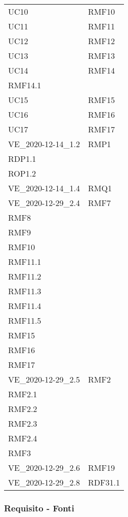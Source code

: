 \begin{longtable}[h!] { >{\centering}m{5cm} >{\centering}m{5cm} }
	 \tabularnewline
	 UC10 & RMF10
	 \tabularnewline
	 UC11 & RMF11
	 \tabularnewline
	 UC12 & RMF12
	 \tabularnewline
	 UC13 & RMF13
	 \tabularnewline
	 UC14 & RMF14 \\
	 RMF14.1
	 \tabularnewline
	 UC15 & RMF15
	 \tabularnewline
	 UC16 & RMF16
	 \tabularnewline
	 UC17 & RMF17
	 \tabularnewline
	 VE\_2020-12-14\_1.2 & RMP1 \\
	 RDP1.1 \\
	 ROP1.2
	 \tabularnewline
	 VE\_2020-12-14\_1.4 & RMQ1
	 \tabularnewline
	 VE\_2020-12-29\_2.4 & RMF7\\
	 RMF8 \\
	 RMF9 \\
	 RMF10 \\
	 RMF11.1 \\
	 RMF11.2 \\
	 RMF11.3 \\
	 RMF11.4 \\
	 RMF11.5 \\
	 RMF15 \\
	 RMF16 \\
	 RMF17 
	 \tabularnewline
	 VE\_2020-12-29\_2.5 & RMF2 \\
	 RMF2.1 \\
	 RMF2.2 \\
	 RMF2.3 \\
	 RMF2.4 \\
	 RMF3
	 \tabularnewline
	 VE\_2020-12-29\_2.6 & RMF19
	 \tabularnewline
	 VE\_2020-12-29\_2.8 & RDF31.1
	 \tabularnewline

\end{longtable}

\newpage

\subsubsection{Requisito - Fonti}

